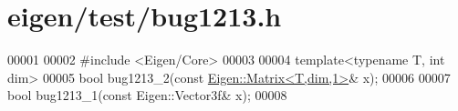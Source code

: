 \hypertarget{eigen_2test_2bug1213_8h_source}{}\section{eigen/test/bug1213.h}
\label{eigen_2test_2bug1213_8h_source}

\begin{DoxyCode}
00001 
00002 \textcolor{preprocessor}{#include <Eigen/Core>}
00003 
00004 \textcolor{keyword}{template}<\textcolor{keyword}{typename} T, \textcolor{keywordtype}{int} dim>
00005 \textcolor{keywordtype}{bool} bug1213\_2(\textcolor{keyword}{const} \hyperlink{group___core___module_class_eigen_1_1_matrix}{Eigen::Matrix<T,dim,1>}& x);
00006 
00007 \textcolor{keywordtype}{bool} bug1213\_1(\textcolor{keyword}{const} Eigen::Vector3f& x);
00008 
\end{DoxyCode}
